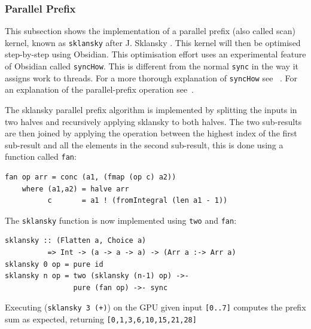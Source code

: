 \subsubsection{Parallel Prefix}
\FloatBarrier

This subsection shows the implementation of a parallel prefix (also called scan) 
kernel, known as {\tt sklansky} after J. Sklansky .
This kernel will then be optimised step-by-step using Obsidian. This 
optimisation effort uses an experimental feature of Obsidian called {\tt syncHow}. 
This is different from the normal {\tt sync} in the way it assigns work to threads. 
For a more thorough explanation of {\tt syncHow} see ~.
For an explanation of the parallel-prefix operation see~. 

The sklansky parallel prefix algorithm 
is implemented by splitting the inputs in two halves and recursively 
applying sklansky to both halves. The two sub-results are then 
joined by applying the operation between the highest index of the first
sub-result and all the elements in the second sub-result, this is done 
using a function called {\tt fan}: 

\begin{small}
\begin{verbatim}
fan op arr = conc (a1, (fmap (op c) a2)) 
    where (a1,a2) = halve arr
          c       = a1 ! (fromIntegral (len a1 - 1))
\end{verbatim}
\end{small}
\noindent
The {\tt sklansky} function is now implemented using 
{\tt two} and {\tt fan}: 

\begin{small}
\begin{verbatim}
sklansky :: (Flatten a, Choice a) 
          => Int -> (a -> a -> a) -> (Arr a :-> Arr a) 
sklansky 0 op = pure id
sklansky n op = two (sklansky (n-1) op) ->- 
                pure (fan op) ->- sync
\end{verbatim}
\end{small}

Executing ({\tt sklansky 3 (+)}) on the GPU given input {\tt [0..7]} computes
the prefix sum as expected, returning {\tt [0,1,3,6,10,15,21,28]} 


